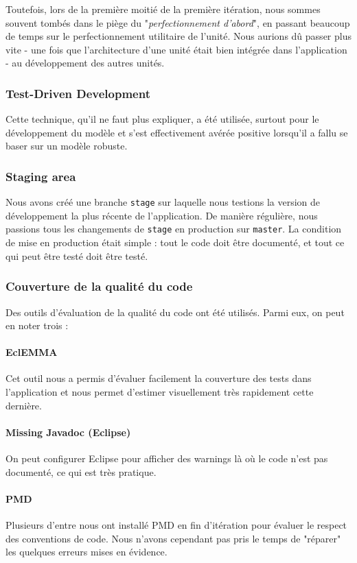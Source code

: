 	Toutefois, lors de la première moitié de la première itération, nous sommes
	souvent tombés dans le piège du "\textit{perfectionnement d'abord}", en
	passant beaucoup de temps sur le perfectionnement utilitaire de l'unité.
	Nous aurions dû passer plus vite - une fois que l'architecture d'une unité
	était bien intégrée dans l'application - au développement des autres unités.

	\subsubsection{Test-Driven Development}
	Cette technique, qu'il ne faut plus expliquer, a été utilisée, surtout pour
	le développement du modèle et s'est effectivement avérée positive lorsqu'il
	a fallu se baser sur un modèle robuste.

	\subsubsection{Staging area}
	Nous avons créé une branche \texttt{stage} sur laquelle nous testions la 
	version de développement la plus récente de l'application. De manière
	régulière, nous passions tous les changements de \texttt{stage} en
	production sur \texttt{master}. La condition de mise en production était 
	simple : tout le code doit être documenté, et tout ce qui peut être testé
	doit être testé.

	\subsubsection{Couverture de la qualité du code}
	Des outils d'évaluation de la qualité du code ont été utilisés. Parmi eux, 
	on peut en noter trois : 

	\paragraph{EclEMMA}
	Cet outil nous a permis d'évaluer facilement la couverture des tests dans 
	l'application et nous permet d'estimer visuellement très rapidement cette 
	dernière.

	\paragraph{Missing Javadoc (Eclipse)}
	On peut configurer Eclipse pour afficher des warnings là où le code n'est
	pas documenté, ce qui est très pratique.

	\paragraph{PMD}
	Plusieurs d'entre nous ont installé PMD en fin d'itération pour évaluer le
	respect des conventions de code. Nous n'avons cependant pas pris le temps
	de "réparer" les quelques erreurs mises en évidence.

